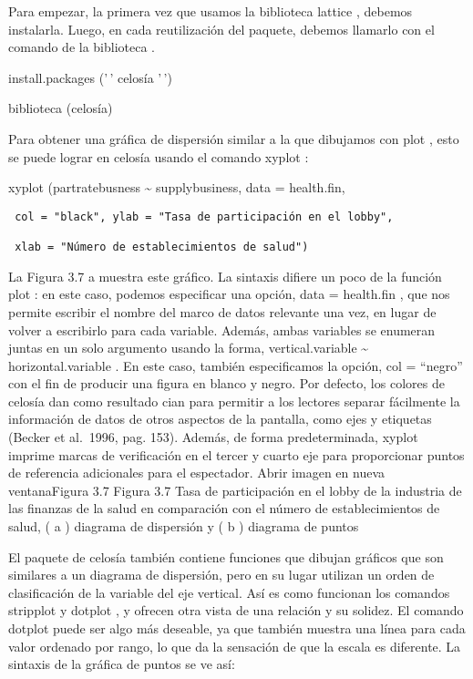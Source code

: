 \documentclass[
]{book}
\begin{document}
Para empezar, la primera vez que usamos la biblioteca lattice , debemos instalarla. Luego, en cada reutilización del paquete, debemos llamarlo con el comando de la biblioteca .

install.packages ('\,' celosía '\,')

biblioteca (celosía)

Para obtener una gráfica de dispersión similar a la que dibujamos con plot , esto se puede lograr en celosía usando el comando xyplot :

xyplot (partratebusness \textasciitilde{} supplybusiness, data = health.fin,

\begin{verbatim}
 col = "black", ylab = "Tasa de participación en el lobby",

 xlab = "Número de establecimientos de salud")
\end{verbatim}

La Figura 3.7 a muestra este gráfico. La sintaxis difiere un poco de la función plot : en este caso, podemos especificar una opción, data = health.fin , que nos permite escribir el nombre del marco de datos relevante una vez, en lugar de volver a escribirlo para cada variable. Además, ambas variables se enumeran juntas en un solo argumento usando la forma, vertical.variable \textasciitilde{} horizontal.variable . En este caso, también especificamos la opción, col = ``negro'' con el fin de producir una figura en blanco y negro. Por defecto, los colores de celosía dan como resultado cian para permitir a los lectores separar fácilmente la información de datos de otros aspectos de la pantalla, como ejes y etiquetas (Becker et al.~1996, pag. 153). Además, de forma predeterminada, xyplot imprime marcas de verificación en el tercer y cuarto eje para proporcionar puntos de referencia adicionales para el espectador.
Abrir imagen en nueva ventanaFigura 3.7
Figura 3.7
Tasa de participación en el lobby de la industria de las finanzas de la salud en comparación con el número de establecimientos de salud, ( a ) diagrama de dispersión y ( b ) diagrama de puntos

El paquete de celosía también contiene funciones que dibujan gráficos que son similares a un diagrama de dispersión, pero en su lugar utilizan un orden de clasificación de la variable del eje vertical. Así es como funcionan los comandos stripplot y dotplot , y ofrecen otra vista de una relación y su solidez. El comando dotplot puede ser algo más deseable, ya que también muestra una línea para cada valor ordenado por rango, lo que da la sensación de que la escala es diferente. La sintaxis de la gráfica de puntos se ve así:
\end{document}
